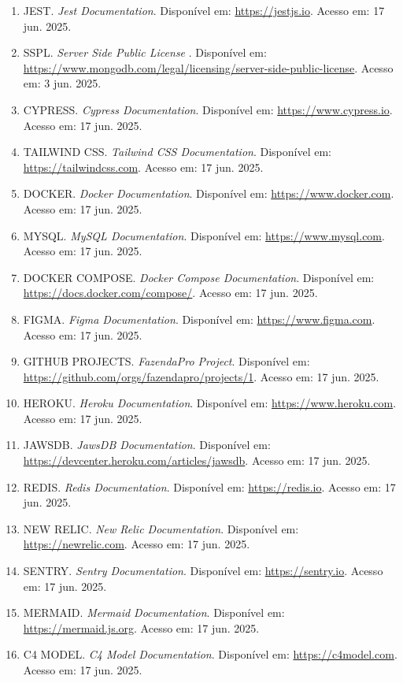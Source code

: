 \documentclass[12pt, a4paper]{article}
\begin{document}
\begin{spacing}{1.5}
\begin{spacing}{1.5}
\begin{enumerate}
    \item JEST. \textit{Jest Documentation}. Disponível em: \url{https://jestjs.io}. Acesso em: 17 jun. 2025.
    \item SSPL. \textit{Server Side Public License
}. Disponível em: \url{https://www.mongodb.com/legal/licensing/server-side-public-license}. Acesso em: 3 jun. 2025.
    \item CYPRESS. \textit{Cypress Documentation}. Disponível em: \url{https://www.cypress.io}. Acesso em: 17 jun. 2025.
    \item TAILWIND CSS. \textit{Tailwind CSS Documentation}. Disponível em: \url{https://tailwindcss.com}. Acesso em: 17 jun. 2025.
    \item DOCKER. \textit{Docker Documentation}. Disponível em: \url{https://www.docker.com}. Acesso em: 17 jun. 2025.
    \item MYSQL. \textit{MySQL Documentation}. Disponível em: \url{https://www.mysql.com}. Acesso em: 17 jun. 2025.
    \item DOCKER COMPOSE. \textit{Docker Compose Documentation}. Disponível em: \url{https://docs.docker.com/compose/}. Acesso em: 17 jun. 2025.
    \item FIGMA. \textit{Figma Documentation}. Disponível em: \url{https://www.figma.com}. Acesso em: 17 jun. 2025.
    \item GITHUB PROJECTS. \textit{FazendaPro Project}. Disponível em: \url{https://github.com/orgs/fazendapro/projects/1}. Acesso em: 17 jun. 2025.
    \item HEROKU. \textit{Heroku Documentation}. Disponível em: \url{https://www.heroku.com}. Acesso em: 17 jun. 2025.
    \item JAWSDB. \textit{JawsDB Documentation}. Disponível em: \url{https://devcenter.heroku.com/articles/jawsdb}. Acesso em: 17 jun. 2025.
    \item REDIS. \textit{Redis Documentation}. Disponível em: \url{https://redis.io}. Acesso em: 17 jun. 2025.
    \item NEW RELIC. \textit{New Relic Documentation}. Disponível em: \url{https://newrelic.com}. Acesso em: 17 jun. 2025.
    \item SENTRY. \textit{Sentry Documentation}. Disponível em: \url{https://sentry.io}. Acesso em: 17 jun. 2025.
    \item MERMAID. \textit{Mermaid Documentation}. Disponível em: \url{https://mermaid.js.org}. Acesso em: 17 jun. 2025.
    \item C4 MODEL. \textit{C4 Model Documentation}. Disponível em: \url{https://c4model.com}. Acesso em: 17 jun. 2025.

\end{enumerate}
\end{spacing}
\end{spacing}
\end{document}
